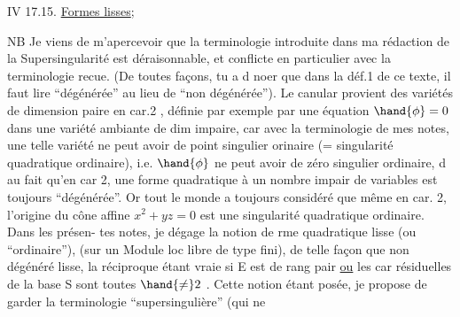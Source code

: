  

IV 17.15. \uline{Formes lisses};  

NB Je viens de m'apercevoir \hand{\textsuperscript{\unsure{$\dagger$}}}que la terminologie introduite dans
ma rédaction  de la Supersingularité est déraisonnable, et conflicte
en particulier avec la terminologie recue. (De toutes façons, tu a d\hand{\^{\textcolor{black}{u}}}
noer que dans la déf.1 de ce texte, il faut lire ``dégénérée'' au lieu de
``non dégénérée''). Le canular provient des variétés de dimension paire
en car.2 ,  définie par exemple par une équation $\hand{\phi}=0$
dans une variété ambiante de dim impaire, car avec la terminologie de mes
notes, une telle variété ne peut avoir de  point singulier
orinaire (= singularité quadratique ordinaire), i.e. $\hand{\phi}$ ne peut avoir
de zéro singulier ordinaire, d\hand{\^{\textcolor{black}{u}}} au fait qu'en car 2, une forme quadratique
à un nombre impair de variables est toujours ``dégénérée''. Or tout le
monde a toujours considéré que même en car. 2, l'origine du cône affine
$x^2 + yz = 0$ est une singularité quadratique ordinaire. Dans les présen-%
tes notes, je dégage la notion de rme quadratique lisse (ou ``ordinaire''),
(sur un Module loc libre de type fini), de telle façon que
non dégénéré \hand{$\Longrightarrow$} lisse, la réciproque étant vraie si E est de rang pair
\uline{ou} les car résiduelles de la base S sont toutes $\hand{\neq} 2$ . Cette notion étant
posée, je propose de garder la terminologie ``supersingulière'' (qui ne
